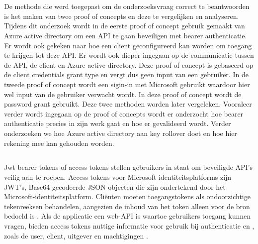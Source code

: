 
\chapter{}
\label{ch:methodologie}


De methode die werd toegepast om de onderzoeksvraag correct te beantwoorden is het maken van twee proof of concepts en deze te vergelijken en analyseren. Tijdens dit onderzoek wordt in de eerste proof of concept gebruik gemaakt van Azure active directory om een API te gaan beveiligen met bearer authenticatie. Er wordt ook gekeken naar hoe een client geconfigureerd kan worden om toegang te krijgen tot deze API. Er wordt ook dieper ingegaan op de communicatie tussen de API, de client en Azure active directory. Deze proof of concept is gebaseerd op de client credentials grant type en vergt dus geen input van een gebruiker. In de tweede proof of concept wordt een sigin-in met Microsoft gebruikt waardoor hier wel input van de gebruiker verwacht wordt. In deze proof of concept wordt de password grant gebruikt. Deze twee methoden worden later vergeleken. Vooraleer verder wordt ingegaan op de proof of concepts wordt er onderzocht hoe bearer authenticatie precies in zijn werk gaat en hoe er gevalideerd wordt. Verder onderzoeken we hoe Azure active directory aan key rollover doet en hoe hier rekening mee kan gehouden worden.

\section{}
Jwt bearer tokens of access tokens stellen gebruikers in staat om beveiligde API's veilig aan te roepen. Access tokens voor Microsoft-identiteitsplatforms zijn JWT's, Base64-gecodeerde JSON-objecten die zijn ondertekend door het Microsoft-identiteitsplatform. Cliënten moeten toegangstokens als ondoorzichtige tekenreeksen behandelen, aangezien de inhoud van het token alleen voor de bron bedoeld is \autocite{hpsin2020}.\newline
Als de applicatie een web-API is waartoe gebruikers toegang kunnen vragen, bieden access tokens nuttige informatie voor gebruik bij authenticatie en , zoals de user, client, uitgever en machtigingen \autocite{hpsin2020}.
